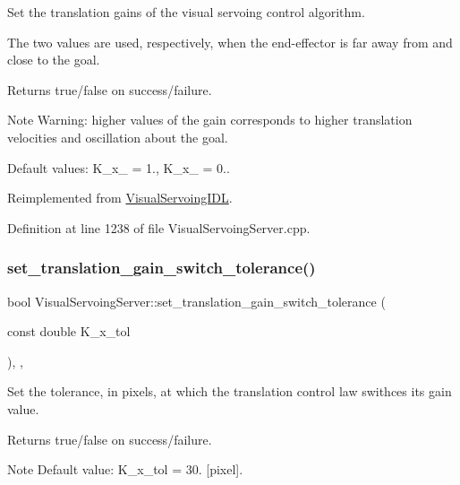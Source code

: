 Set the translation gains of the visual servoing control algorithm. 

The two values are used, respectively, when the end-\/effector is far away from and close to the goal. \begin{DoxyReturn}{Returns}
true/false on success/failure. 
\end{DoxyReturn}
\begin{DoxyNote}{Note}
Warning\+: higher values of the gain corresponds to higher translation velocities and oscillation about the goal. 

Default values\+: K\+\_\+x\+\_ = 1., K\+\_\+x\+\_ = 0.. 
\end{DoxyNote}


Reimplemented from \hyperlink{classVisualServoingIDL_a49034ed3c3d7b150ea0edb984217af31}{Visual\+Servoing\+I\+DL}.



Definition at line 1238 of file Visual\+Servoing\+Server.\+cpp.

\mbox{\label{classVisualServoingServer_a280690a55037cfaaacd39ca95470a507}} 
\subsubsection{\texorpdfstring{set\+\_\+translation\+\_\+gain\+\_\+switch\+\_\+tolerance()}{set\_translation\_gain\_switch\_tolerance()}}
{\footnotesize\ttfamily bool Visual\+Servoing\+Server\+::set\+\_\+translation\+\_\+gain\+\_\+switch\+\_\+tolerance (\begin{DoxyParamCaption}\item[{const double}]{K\+\_\+x\+\_\+tol }\end{DoxyParamCaption})\hspace{0.3cm}{\ttfamily [override]}, {\ttfamily [protected]}, {\ttfamily [virtual]}}



Set the tolerance, in pixels, at which the translation control law swithces its gain value. 

\begin{DoxyReturn}{Returns}
true/false on success/failure. 
\end{DoxyReturn}
\begin{DoxyNote}{Note}
Default value\+: K\+\_\+x\+\_\+tol = 30. \mbox{[}pixel\mbox{]}. 
\end{DoxyNote}


